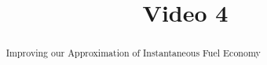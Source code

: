 \documentclass[handout]{ximera}
\title{Video 4}
\begin{document}
\begin{abstract}
Improving our Approximation of Instantaneous Fuel Economy
\end{abstract}

\maketitle

\end{document}
